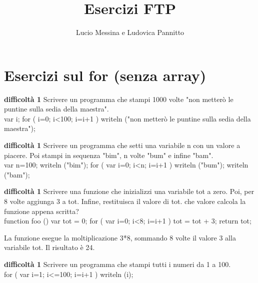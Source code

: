 \documentclass{article}
\newenvironment{solution}{\verbatim}{\endverbatim}
\newenvironment{exercise}[3]{%
\noindent \textbf{\footnotesize difficoltà #2}
#3 \\
}{}
\begin{document}
\title{Esercizi FTP}
\author{Lucio Messina e Ludovica Pannitto}
\maketitle

\section{Esercizi sul for (senza array)}

\begin{exercise}{for}{1}{Scrivere un programma che stampi 1000 volte "non metterò le puntine sulla sedia della maestra".}
\begin{solution}
var i;
for ( i=0; i<100; i=i+1 )
{
    writeln ("non metterò le puntine sulla sedia della maestra");
}
\end{solution}
\end{exercise}

\begin{exercise}{for}{1}{Scrivere un programma che setti una variabile n con un valore a piacere. Poi stampi in sequenza "bim", n volte "bum" e infine "bam".}
\begin{solution}
var n=100;
writeln ("bim");
for ( var i=0; i<n; i=i+1 )
{
    writeln ("bum");
}
writeln ("bam");
\end{solution}
\end{exercise}

\begin{exercise}{for}{1}{Scrivere una funzione che inizializzi una variabile tot a zero. Poi, per 8 volte aggiunga 3 a tot. Infine, restituisca il valore di tot.
che valore calcola la funzione appena scritta?}
\begin{solution}
function foo ()
{
    var tot = 0;
    for ( var i=0; i<8; i=i+1 )
    {
         tot = tot + 3;
    }
    return tot;
}

La funzione esegue la moltiplicazione 3*8, sommando 8 volte il valore 3 alla variabile tot. Il risultato è 24.

\end{solution}
\end{exercise}

\begin{exercise}{for}{1}{Scrivere un programma che stampi tutti i numeri da 1 a 100.}
\begin{solution}
for ( var i=1; i<=100; i=i+1 )
{
    writeln (i);
}
\end{solution}
\end{exercise}
\end{document}
